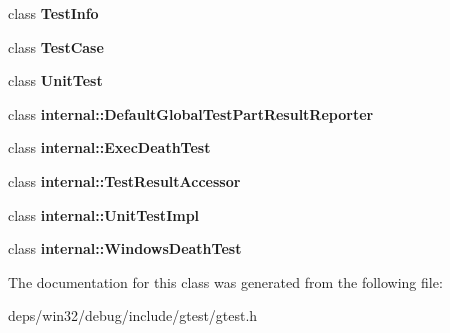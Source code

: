 \begin{DoxyCompactItemize}
\item 
\hypertarget{classtesting_1_1_test_result_aed3c96e2bd5a46339c1cbe49a4a233ee}{}class {\bfseries Test\+Info}\label{classtesting_1_1_test_result_aed3c96e2bd5a46339c1cbe49a4a233ee}

\item 
\hypertarget{classtesting_1_1_test_result_a61fe0349d692eb6d4f5b94e35049b2e9}{}class {\bfseries Test\+Case}\label{classtesting_1_1_test_result_a61fe0349d692eb6d4f5b94e35049b2e9}

\item 
\hypertarget{classtesting_1_1_test_result_aaeb07ea6ba11473f5b2ff2067a1d734a}{}class {\bfseries Unit\+Test}\label{classtesting_1_1_test_result_aaeb07ea6ba11473f5b2ff2067a1d734a}

\item 
\hypertarget{classtesting_1_1_test_result_ac731f0389a3fc3cae64a80a5e53acc2a}{}class {\bfseries internal\+::\+Default\+Global\+Test\+Part\+Result\+Reporter}\label{classtesting_1_1_test_result_ac731f0389a3fc3cae64a80a5e53acc2a}

\item 
\hypertarget{classtesting_1_1_test_result_a6a009268369159ee3ff3d162e5c9f0b4}{}class {\bfseries internal\+::\+Exec\+Death\+Test}\label{classtesting_1_1_test_result_a6a009268369159ee3ff3d162e5c9f0b4}

\item 
\hypertarget{classtesting_1_1_test_result_a9409280e3d708ddb050e1b9922b91522}{}class {\bfseries internal\+::\+Test\+Result\+Accessor}\label{classtesting_1_1_test_result_a9409280e3d708ddb050e1b9922b91522}

\item 
\hypertarget{classtesting_1_1_test_result_aa684cc13a8f91b00c0c9ce41ec7474eb}{}class {\bfseries internal\+::\+Unit\+Test\+Impl}\label{classtesting_1_1_test_result_aa684cc13a8f91b00c0c9ce41ec7474eb}

\item 
\hypertarget{classtesting_1_1_test_result_ab7ea7e66d98b6380f6216e44ce744390}{}class {\bfseries internal\+::\+Windows\+Death\+Test}\label{classtesting_1_1_test_result_ab7ea7e66d98b6380f6216e44ce744390}

\end{DoxyCompactItemize}


The documentation for this class was generated from the following file\+:\begin{DoxyCompactItemize}
\item 
deps/win32/debug/include/gtest/gtest.\+h\end{DoxyCompactItemize}
